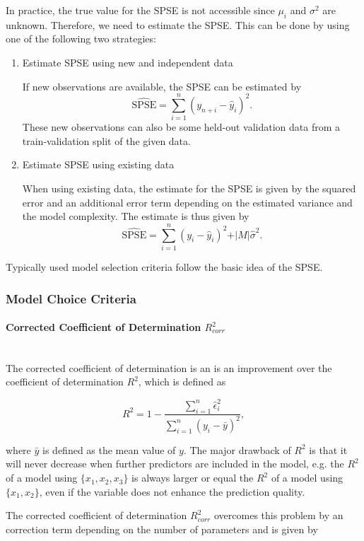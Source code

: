 \documentclass[10pt,a4paper]{article}
\newcommand{\subsubsubsection}[1]{\paragraph{#1}\mbox{}\\}
\begin{document}
In practice, the true value for the SPSE is not accessible since $\mu_i$ and $\sigma^2$ are unknown. Therefore, we need to estimate the SPSE. This can be done by using one of the following two strategies:

\begin{enumerate}

\item Estimate SPSE using new and independent data

If new observations are available, the SPSE can be estimated by
$$\widehat{\text{SPSE}} = \sum_{i=1}^n (y_{n+i} - \hat y_i)^2.$$
These new observations can also be some held-out validation data from a train-validation split of the given data. 

\item Estimate SPSE using existing data

When using existing data, the estimate for the SPSE is given by the squared error and an additional error term depending on the estimated variance and the model complexity. The estimate is thus given by
$$\widehat{\text{SPSE}} = \sum_{i=1}^n(y_i - \hat y_i)^2 + \vert M \vert \hat \sigma^2.$$
\end{enumerate}

Typically used model selection criteria follow the basic idea of the SPSE.

\subsubsection{Model Choice Criteria}

\subsubsubsection{Corrected Coefficient of Determination $R^2_{corr}$}

The corrected coefficient of determination is an is an improvement over the coefficient of determination $R^2$, which is defined as 

$$R^2 = 1 - \frac{\sum_{i=1}^n \hat \epsilon_i^2}{\sum_{i=1}^n (y_i - \bar y)^2},$$

where $\bar y$ is defined as the mean value of $y$. The major drawback of $R^2$ is that it will never decrease when further predictors are included in the model, e.g. the $R^2$ of a model using $\{x_1, x_2, x_3\}$ is always larger or equal the $R^2$ of a model using $\{x_1, x_2\}$, even if the variable does not enhance the prediction quality. 

The corrected coefficient of determination $R_{corr}^2$ overcomes this problem by an correction term depending on the  number of parameters and is given by
\end{document}
